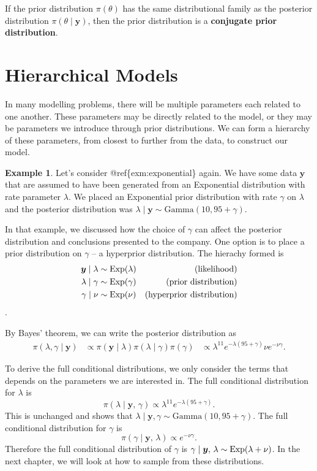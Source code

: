 \documentclass[
]{book}
\theoremstyle{definition}
\theoremstyle{definition}
\newtheorem{example}{Example}[chapter]
\theoremstyle{definition}
\theoremstyle{definition}
\theoremstyle{remark}
\begin{document}
If the prior distribution \(\pi(\theta)\) has the same distributional family as the posterior distribution \(\pi(\theta \mid \boldsymbol{y})\), then the prior distribution is a \textbf{conjugate prior distribution}.

\hypertarget{hierarchical-models}{%
\section{Hierarchical Models}\label{hierarchical-models}}

In many modelling problems, there will be multiple parameters each related to one another. These parameters may be directly related to the model, or they may be parameters we introduce through prior distributions. We can form a hierarchy of these parameters, from closest to further from the data, to construct our model.

\begin{example}
Let's consider @ref\{exm:exponential\} again. We have some data \(\boldsymbol{y}\) that are assumed to have been generated from an Exponential distribution with rate parameter \(\lambda\). We placed an Exponential prior distribution with rate \(\gamma\) on \(\lambda\) and the posterior distribution was \(\lambda \mid \boldsymbol{y} \sim \textrm{Gamma}(10, 95 + \gamma)\).

In that example, we discussed how the choice of \(\gamma\) can affect the posterior distribution and conclusions presented to the company. One option is to place a prior distribution on \(\gamma\) -- a hyperprior distribution. The hierachy formed is
\begin{align*}
\boldsymbol{y} \mid \lambda &\sim \hbox{Exp}(\lambda) & \textrm{(likelihood)} \\
\lambda \mid \gamma &\sim \hbox{Exp}(\gamma) & \textrm{(prior distribution)} \\
\gamma \mid \nu &\sim \hbox{Exp}(\nu) & \textrm{(hyperprior distribution)}  \\
\end{align*}.

By Bayes' theorem, we can write the posterior distribution as
\begin{align*}
\pi(\lambda, \gamma \mid \boldsymbol{y}) &\propto \pi(\boldsymbol{y} \mid \lambda)\pi(\lambda \mid \gamma)\pi(\gamma)
&\propto \lambda^{11}e^{-\lambda(95 + \gamma)}\nu e^{-\nu\gamma}.
\end{align*}

To derive the full conditional distributions, we only consider the terms that depends on the parameters we are interested in. The full conditional distribution for \(\lambda\) is
\[
\pi(\lambda \mid \boldsymbol{y}, \,\gamma) \propto \lambda^{11}e^{-\lambda(95 + \gamma)}.
\]
This is unchanged and shows that \(\lambda \mid \boldsymbol{y}, \gamma \sim \textrm{Gamma}(10, 95 + \gamma)\). The full conditional distribution for \(\gamma\) is
\[
\pi(\gamma \mid \boldsymbol{y}, \,\lambda) \propto e^{-\nu\gamma}.
\]
Therefore the full conditional distribution of \(\gamma\) is \(\gamma \mid \boldsymbol{y}, \,\lambda \sim \hbox{Exp}(\lambda + \nu)\).
In the next chapter, we will look at how to sample from these distributions.
\end{example}
\end{document}
